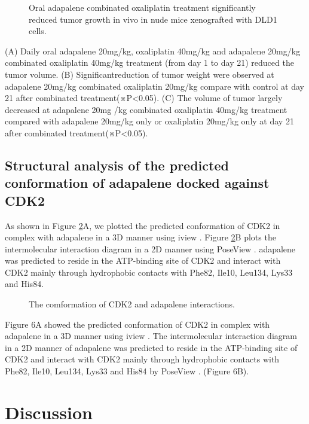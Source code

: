 \begin{figure}
\centering
\caption{Oral adapalene combinated oxaliplatin treatment significantly reduced tumor growth in vivo in nude mice xenografted with DLD1 cells.}
\label{cdk2:Figure5}
\end{figure}
(A) Daily oral adapalene 20mg/kg, oxaliplatin 40mg/kg and adapalene 20mg/kg combinated oxaliplatin 40mg/kg treatment (from day 1 to day 21) reduced the tumor volume. (B) Significantreduction of tumor weight were observed at adapalene 20mg/kg combinated oxaliplatin 20mg/kg compare with control at day 21 after combinated treatment(※P<0.05). (C) The volume of tumor largely decreased at adapalene 20mg /kg combinated oxaliplatin 40mg/kg treatment compared with adapalene 20mg/kg only or oxaliplatin 20mg/kg only at day 21 after combinated treatment(※P<0.05).

\subsection{Structural analysis of the predicted conformation of adapalene docked against CDK2}

As shown in Figure \ref{cdk2:Figure6}A, we plotted the predicted conformation of CDK2 in complex with adapalene in a 3D manner using iview \citep{1366}. Figure \ref{cdk2:Figure6}B plots the intermolecular interaction diagram in a 2D manner using PoseView \citep{748}. adapalene was predicted to reside in the ATP-binding site of CDK2 and interact with CDK2 mainly through hydrophobic contacts with Phe82, Ile10, Leu134, Lys33 and His84.

\begin{figure}
\centering
\caption{The comformation of CDK2 and adapalene interactions.}
\label{cdk2:Figure6}
\end{figure}
Figure 6A showed the predicted conformation of CDK2 in complex with adapalene in a 3D manner using iview \citep{1366}. The intermolecular interaction diagram in a 2D manner of adapalene was predicted to reside in the ATP-binding site of CDK2 and interact with CDK2 mainly through hydrophobic contacts with Phe82, Ile10, Leu134, Lys33 and His84 by PoseView \citep{748}. (Figure 6B).


\section{Discussion}

